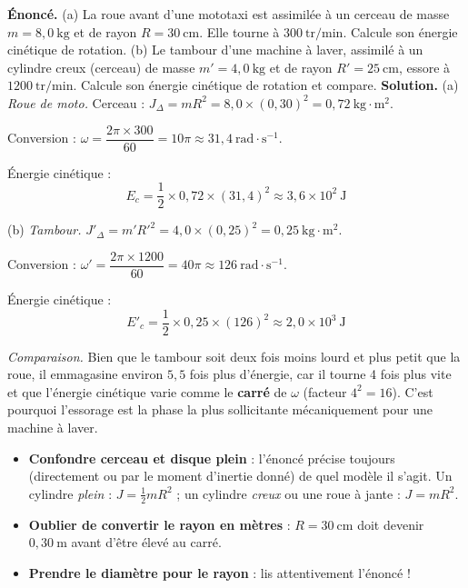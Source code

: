 \documentclass[11pt]{article}
\begin{document}
\begin{exoresolu}
\textbf{Énoncé.} (a) La roue avant d'une mototaxi est assimilée à un cerceau de masse $m = 8{,}0~\mathrm{kg}$ et de rayon $R = 30~\mathrm{cm}$. Elle tourne à $300~\mathrm{tr/min}$. Calcule son énergie cinétique de rotation. (b) Le tambour d'une machine à laver, assimilé à un cylindre creux (cerceau) de masse $m' = 4{,}0~\mathrm{kg}$ et de rayon $R' = 25~\mathrm{cm}$, essore à $1200~\mathrm{tr/min}$. Calcule son énergie cinétique de rotation et compare.
\tcblower
\textbf{Solution.} (a) \emph{Roue de moto.} Cerceau : $J_\Delta = mR^2 = 8{,}0\times(0{,}30)^2 = 0{,}72~\mathrm{kg\cdot m^2}$.

Conversion : $\omega = \dfrac{2\pi\times 300}{60} = 10\pi \approx 31{,}4~\mathrm{rad\cdot s^{-1}}$.

Énergie cinétique :
\[ E_c = \frac{1}{2}\times 0{,}72\times(31{,}4)^2 \approx 3{,}6\times10^{2}~\mathrm{J} \]

(b) \emph{Tambour.} $J'_\Delta = m'R'^2 = 4{,}0\times(0{,}25)^2 = 0{,}25~\mathrm{kg\cdot m^2}$.

Conversion : $\omega' = \dfrac{2\pi\times 1200}{60} = 40\pi \approx 126~\mathrm{rad\cdot s^{-1}}$.

Énergie cinétique :
\[ E'_c = \frac{1}{2}\times 0{,}25\times(126)^2 \approx 2{,}0\times10^{3}~\mathrm{J} \]

\emph{Comparaison.} Bien que le tambour soit deux fois moins lourd et plus petit que la roue, il emmagasine environ $5{,}5$ fois plus d'énergie, car il tourne 4 fois plus vite et que l'énergie cinétique varie comme le \textbf{carré} de $\omega$ (facteur $4^2 = 16$). C'est pourquoi l'essorage est la phase la plus sollicitante mécaniquement pour une machine à laver.
\end{exoresolu}

\begin{attention}
\begin{itemize}
  \item \textbf{Confondre cerceau et disque plein} : l'énoncé précise toujours (directement ou par le moment d'inertie donné) de quel modèle il s'agit. Un cylindre \emph{plein} : $J = \tfrac{1}{2}mR^2$ ; un cylindre \emph{creux} ou une roue à jante : $J = mR^2$.
  \item \textbf{Oublier de convertir le rayon en mètres} : $R = 30~\mathrm{cm}$ doit devenir $0{,}30~\mathrm{m}$ avant d'être élevé au carré.
  \item \textbf{Prendre le diamètre pour le rayon} : lis attentivement l'énoncé !
\end{itemize}
\end{attention}
\end{document}
